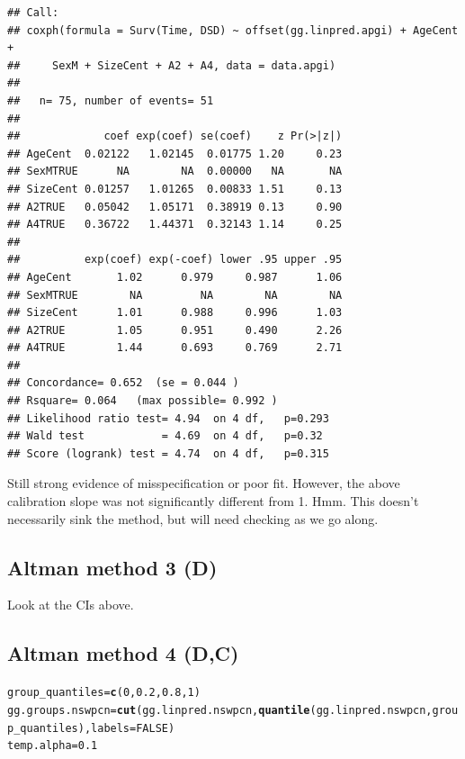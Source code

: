 \documentclass{article}\usepackage[]{graphicx}\usepackage[]{color}
\makeatletter
\newcommand{\hlnum}[1]{\textcolor[rgb]{0.686,0.059,0.569}{#1}}%
\newcommand{\hlstd}[1]{\textcolor[rgb]{0.345,0.345,0.345}{#1}}%
\newcommand{\hlkwb}[1]{\textcolor[rgb]{0.69,0.353,0.396}{#1}}%
\newcommand{\hlkwc}[1]{\textcolor[rgb]{0.333,0.667,0.333}{#1}}%
\newcommand{\hlkwd}[1]{\textcolor[rgb]{0.737,0.353,0.396}{\textbf{#1}}}%
\newenvironment{kframe}{%
 \def\at@end@of@kframe{}%
 \ifinner\ifhmode%
  \def\at@end@of@kframe{\end{minipage}}%
  \begin{minipage}{\columnwidth}%
 \fi\fi%
 \def\FrameCommand##1{\hskip\@totalleftmargin \hskip-\fboxsep
 \colorbox{shadecolor}{##1}\hskip-\fboxsep
     \hskip-\linewidth \hskip-\@totalleftmargin \hskip\columnwidth}%
 \MakeFramed {\advance\hsize-\width
   \@totalleftmargin\z@ \linewidth\hsize
   \@setminipage}}%
 {\par\unskip\endMakeFramed%
 \at@end@of@kframe}
\newenvironment{knitrout}{}{} %
\makeatother
\begin{document}
\begin{knitrout}
\begin{kframe}
{\ttfamily\noindent{}}\begin{verbatim}
## Call:
## coxph(formula = Surv(Time, DSD) ~ offset(gg.linpred.apgi) + AgeCent + 
##     SexM + SizeCent + A2 + A4, data = data.apgi)
## 
##   n= 75, number of events= 51 
## 
##             coef exp(coef) se(coef)    z Pr(>|z|)
## AgeCent  0.02122   1.02145  0.01775 1.20     0.23
## SexMTRUE      NA        NA  0.00000   NA       NA
## SizeCent 0.01257   1.01265  0.00833 1.51     0.13
## A2TRUE   0.05042   1.05171  0.38919 0.13     0.90
## A4TRUE   0.36722   1.44371  0.32143 1.14     0.25
## 
##          exp(coef) exp(-coef) lower .95 upper .95
## AgeCent       1.02      0.979     0.987      1.06
## SexMTRUE        NA         NA        NA        NA
## SizeCent      1.01      0.988     0.996      1.03
## A2TRUE        1.05      0.951     0.490      2.26
## A4TRUE        1.44      0.693     0.769      2.71
## 
## Concordance= 0.652  (se = 0.044 )
## Rsquare= 0.064   (max possible= 0.992 )
## Likelihood ratio test= 4.94  on 4 df,   p=0.293
## Wald test            = 4.69  on 4 df,   p=0.32
## Score (logrank) test = 4.74  on 4 df,   p=0.315
\end{verbatim}
\end{kframe}
\end{knitrout}
Still strong evidence of misspecification or poor fit.  However, the above calibration slope was not significantly different from 1.  Hmm.  This doesn't necessarily sink the method, but will need checking as we go along.

\subsection{Altman method 3 (D)}
Look at the CIs above.

\subsection{Altman method 4 (D,C)}
\begin{knitrout}
\color{fgcolor}\begin{kframe}
\begin{alltt}
\hlstd{group_quantiles} \hlkwb{=} \hlkwd{c}\hlstd{(}\hlnum{0}\hlstd{,} \hlnum{0.2}\hlstd{,} \hlnum{0.8}\hlstd{,} \hlnum{1}\hlstd{)}
\hlstd{gg.groups.nswpcn} \hlkwb{=} \hlkwd{cut}\hlstd{(gg.linpred.nswpcn,} \hlkwd{quantile}\hlstd{(gg.linpred.nswpcn, group_quantiles),} \hlkwc{labels} \hlstd{=} \hlnum{FALSE}\hlstd{)}
\hlstd{temp.alpha} \hlkwb{=} \hlnum{0.1}
\end{alltt}
\end{kframe}
\end{knitrout}
\end{document}
